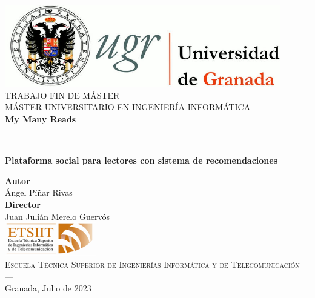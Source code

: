 \begin{titlepage}
\newlength{\centeroffset}
\setlength{\centeroffset}{-0.5\oddsidemargin}
\addtolength{\centeroffset}{0.5\evensidemargin}
\thispagestyle{empty}

\noindent\hspace*{\centeroffset}\begin{minipage}{\textwidth}

\centering
\includegraphics[width=0.9\textwidth]{img/logo_ugr.jpg}\\[1.4cm]

\textsc{ \Large TRABAJO FIN DE MÁSTER\\[0.2cm]}
\textsc{ MÁSTER UNIVERSITARIO EN INGENIERÍA INFORMÁTICA}\\[1cm]

{\Huge\bfseries My Many Reads \\}
\noindent\rule[-1ex]{\textwidth}{3pt}\\[3.5ex]
{\large\bfseries Plataforma social para lectores con sistema de recomendaciones }
\end{minipage}

\vspace{2.5cm}
\noindent\hspace*{\centeroffset}
\begin{minipage}{\textwidth}
\centering

\textbf{Autor}\\ {Ángel Píñar Rivas}\\[2.5ex]
\textbf{Director}\\ {Juan Julián Merelo Guervós}\\[2cm]
\includegraphics[width=0.3\textwidth]{img/etsiit_logo.png}\\[0.1cm]
\textsc{Escuela Técnica Superior de Ingenierías Informática y de Telecomunicación}\\
\textsc{---}\\
Granada, Julio de 2023
\end{minipage}
\end{titlepage}

